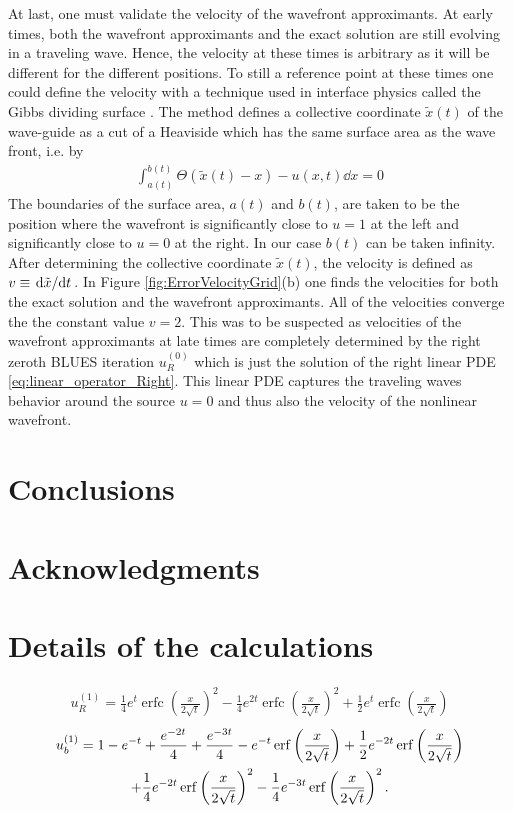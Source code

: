 \documentclass[amsmath,amssymb,amsfonts,aps,pre,preprint,superscriptaddress,bibnotes,showpacs,showkeys,longbibliography]{revtex4-1}
\DeclareMathOperator{\erfc}{erfc}
\begin{document}
At last, one must validate the velocity of the wavefront approximants. At early times, both the wavefront approximants and the exact solution are still evolving in a traveling wave. Hence, the velocity at these times is arbitrary as it will be different for the different positions. To still a reference point at these times one could define the velocity with a technique used in interface physics called the Gibbs dividing surface \cite{gibbs1928collected,Lamorgese2017}. The method defines a collective coordinate $\tilde{x}(t)$ of the wave-guide as a cut of a Heaviside which has the same surface area as the wave front, i.e. by
\begin{align}\label{eq:Gibbs_dividing_surface}
    \int_{a(t)}^{b(t)}  \Theta(\tilde{x}(t)-x)-u(x, t)\dd{x}  =0
\end{align}
The boundaries of the surface area, $a(t)$ and $b(t)$, are taken to be the position where the wavefront is significantly close to $u=1$ at the left and significantly close to $u=0$ at the right. In our case $b(t)$ can be taken infinity. After determining the collective coordinate $\tilde{x}(t)$, the velocity is defined as $v\equiv \dv*{\tilde{x}}{t}$. In Figure \ref{fig:ErrorVelocityGrid}(b) one finds the velocities for both the exact solution and the wavefront approximants. All of the velocities converge the the constant value $v=2$. This was to be suspected as velocities of the wavefront approximants at late times are completely determined by the right zeroth BLUES iteration $u^{(0)}_R$ which is just the solution of the right linear PDE \eqref{eq:linear_operator_Right}. This linear PDE captures the traveling waves behavior around the source $u=0$ and thus also the velocity of the nonlinear wavefront.



\section{Conclusions}
\lipsum[2-3]
\label{sec:conclusions}
\section*{Acknowledgments}

\cleardoublepage
\appendix
\section{Details of the calculations}
\label{sec:Details_of_the_calculculations}
\begin{align}
    u^{(1)}_R = \frac{1}{4} e^t \erfc\left(\frac{x}{2 \sqrt{t}}\right)^2-\frac{1}{4} e^{2 t} \erfc\left(\frac{x}{2 \sqrt{t}}\right)^2+\frac{1}{2} e^t \erfc\left(\frac{x}{2 \sqrt{t}}\right)
\end{align}
\begin{multline}
    u^{(1)}_b 
   =1-e^{-t}+\frac{e^{-2 t}}{4}+\frac{e^{-3 t}}{4}-e^{-t} \erf\left(\frac{x}{2 \sqrt{t}}\right)+\frac{1}{2} e^{-2 t} \erf\left(\frac{x}{2 \sqrt{t}}\right)\\+\frac{1}{4} e^{-2 t} \erf\left(\frac{x}{2 \sqrt{t}}\right)^2-\frac{1}{4} e^{-3 t} \erf\left(\frac{x}{2 \sqrt{t}}\right)^2.
\end{multline}
\end{document}
